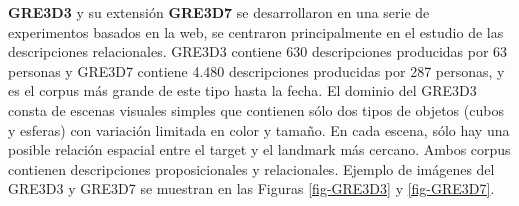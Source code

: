 \label{sec:corpusGRE}
{\bf GRE3D3} y su extensi\'on {\bf GRE3D7} \cite{gre3d3,gre3d7} se desarrollaron en una serie de experimentos basados en la web, se centraron principalmente en el estudio de las descripciones relacionales. GRE3D3 contiene 630 descripciones producidas por 63 personas y GRE3D7 contiene 4.480 descripciones producidas por 287 personas, y es el corpus m\'as grande de este tipo hasta la fecha. El dominio del GRE3D3 consta de escenas visuales simples que contienen s\'olo dos tipos de objetos (cubos y esferas) con variaci\'on limitada en color y tama\~no. En cada escena, s\'olo hay una posible relaci\'on espacial entre el target y el landmark m\'as cercano. Ambos corpus contienen descripciones proposicionales y relacionales. Ejemplo de im\'agenes del GRE3D3 y GRE3D7 se muestran en las Figuras \ref{fig-GRE3D3} y \ref{fig-GRE3D7}.

